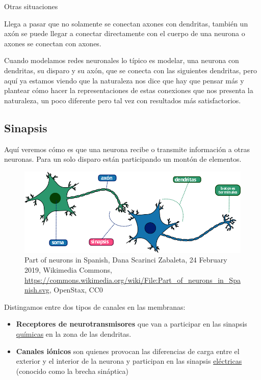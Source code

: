 Otras situaciones 

Llega a pasar que no solamente se conectan axones con dendritas, también un axón se puede llegar a conectar directamente con el cuerpo de una neurona o axones se conectan con axones.

Cuando modelamos redes neuronales lo típico es modelar, una neurona con dendritas, su disparo y su axón, que se conecta con las siguientes dendritas,
pero aquí ya estamos viendo que la naturaleza nos dice que hay que pensar más y plantear cómo hacer la representaciones de estas conexiones que nos presenta la naturaleza, un poco diferente pero tal vez con resultados más satisfactorios.


\subsection{Sinapsis}
Aquí veremos cómo es que una neurona recibe o transmite información a otras neuronas. Para un solo disparo están participando un montón de elementos. 

\begin{figure}[h]
 \centering
 \includegraphics[scale=0.5]{../Figuras/Part_of_neurons_in_Spanish.png}
 \caption{Part of neurons in Spanish, Dana Scarinci Zabaleta, 24 February 2019, Wikimedia Commons, \url{https://commons.wikimedia.org/wiki/File:Part_of_neurons_in_Spanish.svg}, OpenStax, CC0}
 \label{fig:sinapsisN}
\end{figure}

Distingamos entre dos tipos de canales en las membranas: 
\begin{itemize}
\item \textbf{Receptores de neurotransmisores} que van a participar en las sinapsis \underline{químicas} en la zona de las dendritas.
\item \textbf{Canales iónicos} son quienes provocan las diferencias de carga entre el exterior y el interior de la neurona y participan en las sinapsis \underline{eléctricas} (conocido como la brecha sináptica)
\end{itemize}

